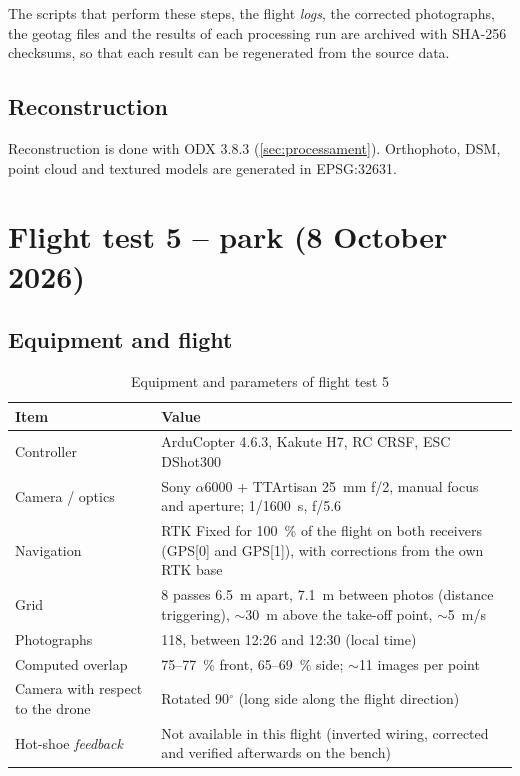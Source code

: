 The scripts that perform these steps, the flight \emph{logs}, the corrected photographs, the geotag files and the results of each processing run are archived with SHA-256 checksums, so that each result can be regenerated from the source data.

\subsection{Reconstruction}

Reconstruction is done with ODX 3.8.3 (\cref{sec:processament}). Orthophoto, DSM, point cloud and textured models are generated in EPSG:32631.

\section{Flight test 5 -- park (8 October 2026)}
\label{sec:vol5}

\subsection{Equipment and flight}

\begin{table}[H]
    \centering
    \caption{Equipment and parameters of flight test 5}
    \label{tab:vol5-equip}
    \small
    \begin{tabular}{lP{9.6cm}}
        \toprule
        Item & Value \\
        \midrule
        Controller & ArduCopter 4.6.3, Kakute H7, RC CRSF, ESC DShot300 \\
        Camera / optics & Sony $\alpha$6000 + TTArtisan 25~mm f/2, manual focus and aperture; 1/1600~s, f/5.6 \\
        Navigation & RTK Fixed for 100~\% of the flight on both receivers (GPS[0] and GPS[1]), with corrections from the own RTK base \\
        Grid & 8 passes 6.5~m apart, 7.1~m between photos (distance triggering), $\sim$30~m above the take-off point, $\sim$5~m/s \\
        Photographs & 118, between 12:26 and 12:30 (local time) \\
        Computed overlap & 75--77~\% front, 65--69~\% side; $\sim$11 images per point \\
        Camera with respect to the drone & Rotated 90$^{\circ}$ (long side along the flight direction) \\
        Hot-shoe \emph{feedback} & Not available in this flight (inverted wiring, corrected and verified afterwards on the bench) \\
        \bottomrule
    \end{tabular}
\end{table}

